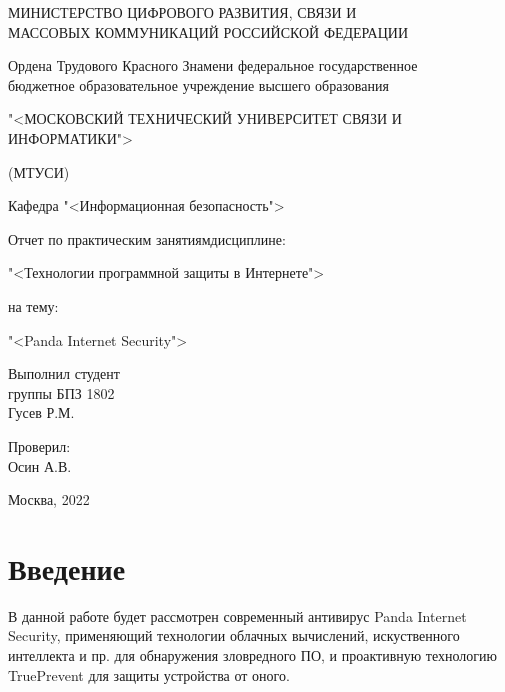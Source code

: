 

    \thispagestyle{empty}
    \begin{center}
        \begin{bfseries}
            \MakeUppercase{Министерство цифрового развития, связи и \\
            массовых коммуникаций Российской федерации}\par
            \bigskip
            Ордена Трудового Красного Знамени федеральное государственное \\
            бюджетное образовательное учреждение высшего образования\par
            \bigskip
            \MakeUppercase{"<Московский Технический Университет Связи И\\Информатики">}\par
            \bigskip
            (МТУСИ)\par\bigskip
        \end{bfseries}
        Кафедра "<Информационная безопасность">\par\bigskip\bigskip
        Отчет по практическим занятиям дисциплине:\par
        "<Технологии программной защиты в Интернете">\par
        на тему:\par"<Panda Internet Security">\par\bigskip
    \end{center}
    \begin{flushright}
        Выполнил студент\\группы БПЗ 1802\\ Гусев Р.М.\par
        \bigskip
        Проверил:\\Осин А.В.
    \end{flushright}
    \vspace*{\fill} 
    \begin{center}{Москва, 2022}\end{center}
    \pagebreak

    \tableofcontents
    \pagebreak

    \section*{Введение}
    В данной работе будет рассмотрен современный антивирус Panda Internet Security, применяющий
    технологии облачных вычислений, искуственного интеллекта и пр. для обнаружения зловредного ПО,
    и проактивную технологию TruePrevent для защиты устройства от оного.\par

